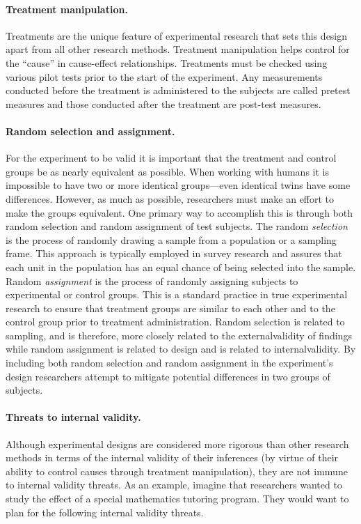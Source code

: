 \paragraph{Treatment manipulation.} Treatments are the unique feature of experimental research that sets this design apart from all other research methods. Treatment manipulation helps control for the ``cause'' in cause-effect relationships. Treatments must be checked using various pilot tests prior to the start of the experiment. Any measurements conducted before the treatment is administered to the subjects are called pretest measures and those conducted after the treatment are post-test measures. 

\paragraph{Random selection and assignment.} For the experiment to be valid it is important that the treatment and control groups be as nearly equivalent as possible. When working with humans it is impossible to have two or more identical groups---even identical twins have some differences. However, as much as possible, researchers must make an effort to make the groups equivalent. One primary way to accomplish this is through both random selection and random assignment of test subjects. The random \textit{selection} is the process of randomly drawing a sample from a population or a sampling frame. This approach is typically employed in survey research and assures that each unit in the population has an equal chance of being selected into the sample. Random \textit{assignment} is the process of randomly assigning subjects to experimental or control groups. This is a standard practice in true experimental research to ensure that treatment groups are similar to each other and to the control group prior to treatment administration. Random selection is related to sampling, and is therefore, more closely related to the \gls{externalvalidity} of findings while random assignment is related to design and is related to \gls{internalvalidity}. By including both random selection and random assignment in the experiment's design researchers attempt to mitigate potential differences in two groups of subjects.

\paragraph{Threats to internal validity.} Although experimental designs are considered more rigorous than other research methods in terms of the internal validity of their inferences (by virtue of their ability to control causes through treatment manipulation), they are not immune to internal validity threats. As an example, imagine that researchers wanted to study the effect of a special mathematics tutoring program. They would want to plan for the following internal validity threats.

